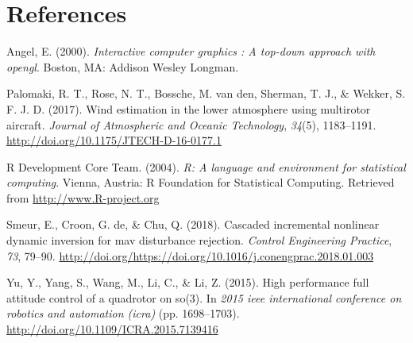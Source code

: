 \documentclass[12pt,oneside]{reedthesis}
\theoremstyle{definition}
\theoremstyle{definition}
\theoremstyle{definition}
\theoremstyle{remark}
\begin{document}
\backmatter

\chapter*{References}\label{references}


\noindent

\setlength{\parindent}{-0.20in} \setlength{\leftskip}{0.20in}
\setlength{\parskip}{8pt}

\hypertarget{refs}{}
\hypertarget{ref-angel2000}{}
Angel, E. (2000). \emph{Interactive computer graphics : A top-down
approach with opengl}. Boston, MA: Addison Wesley Longman.

\hypertarget{ref-wind}{}
Palomaki, R. T., Rose, N. T., Bossche, M. van den, Sherman, T. J., \&
Wekker, S. F. J. D. (2017). Wind estimation in the lower atmosphere
using multirotor aircraft. \emph{Journal of Atmospheric and Oceanic
Technology}, \emph{34}(5), 1183--1191.
\url{http://doi.org/10.1175/JTECH-D-16-0177.1}

\hypertarget{ref-r}{}
R Development Core Team. (2004). \emph{R: A language and environment for
statistical computing}. Vienna, Austria: R Foundation for Statistical
Computing. Retrieved from \url{http://www.R-project.org}

\hypertarget{ref-indi}{}
Smeur, E., Croon, G. de, \& Chu, Q. (2018). Cascaded incremental
nonlinear dynamic inversion for mav disturbance rejection. \emph{Control
Engineering Practice}, \emph{73}, 79--90.
\url{http://doi.org/https://doi.org/10.1016/j.conengprac.2018.01.003}

\hypertarget{ref-pid}{}
Yu, Y., Yang, S., Wang, M., Li, C., \& Li, Z. (2015). High performance
full attitude control of a quadrotor on so(3). In \emph{2015 ieee
international conference on robotics and automation (icra)} (pp.
1698--1703). \url{http://doi.org/10.1109/ICRA.2015.7139416}


\end{document}
